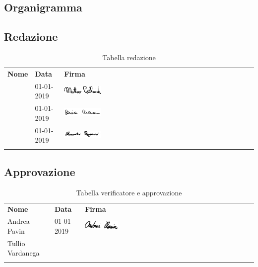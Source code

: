 \begin{appendix}
\section{Organigramma}
\subsection{Redazione}
\begin{center}
	\renewcommand{\arraystretch}{1.5}
	\begin{longtable}[H]{  p{3.5cm}  p{2cm} p{4cm}  }
		\rowcolor{tableHeadYellow}
		\textbf{Nome}   & \textbf{Data} & \textbf{Firma}\\
		\matteo & 01-01-2019 & \includegraphics[width=0.2\textwidth]{../includes/pics/firme/firma_matteo.png}\\
																		
		\sonia & 01-01-2019 & \includegraphics[width=0.2\textwidth]{../includes/pics/firme/firma_sonia.png}\\
		\alessandro & 01-01-2019 & \includegraphics[width=0.2\textwidth]{../includes/pics/firme/firma_alessandro.png}\\
		\rowcolor{white}
		\caption{Tabella redazione}
	\end{longtable}
\end{center}
\subsection{Approvazione}
\begin{center}
	\renewcommand{\arraystretch}{1.5}
	\begin{longtable}[H]{  p{3cm}  p{2cm} p{4cm} }
		\rowcolor{tableHeadYellow}
		\textbf{Nome}   & \textbf{Data} & \textbf{Firma}\\
		Andrea Pavin & 01-01-2019 & \includegraphics[width=0.2\textwidth]{../includes/pics/firme/firma_andrea.png}\\
		Tullio Vardanega & & \\
		\rowcolor{white}
		\caption{Tabella verificatore e approvazione}
	\end{longtable}
\end{center}
\clearpage

\end{appendix}
